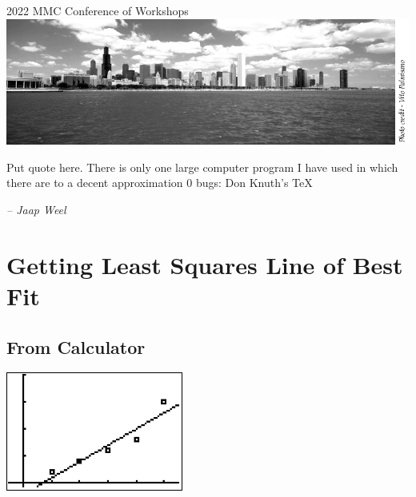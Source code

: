 \documentclass[9pt, oneside]{extarticle}   	%
\begin{document}
\begin{titlepage}
	\vfill %
	\vspace{0.3\baselineskip} %
	2022 %
	{\large MMC Conference of Workshops}\\[.1in] %
	\includegraphics[width=\textwidth]{img/mmc_logo.png}
\end{titlepage}

\tableofcontents
\begin{centering}
	\date{\today}
\end{centering}


\newpage


\epigraph{Put quote here. There is only one large computer program I have used in which there are to a decent approximation 0 bugs: Don Knuth's TeX}{\textit{ -- Jaap Weel}}

\section{Getting Least Squares Line of Best Fit} %
\label{}
\subsection{From Calculator}
	\includegraphics[width=.15\textwidth]{img/5_scat}
\end{document}
